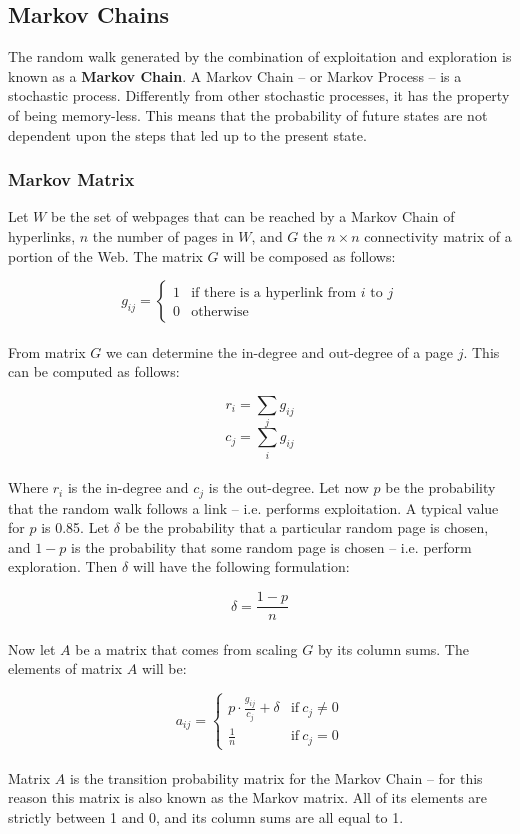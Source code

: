 \documentclass{article}
\begin{document}
\subsection{Markov Chains}
The random walk generated by the combination of exploitation and exploration is known as a \textbf{Markov Chain}. A Markov Chain -- or Markov Process -- is a stochastic process. Differently from other stochastic processes, it has the property of being memory-less. This means that the probability of future states are not dependent upon the steps that led up to the present state.

\subsubsection{Markov Matrix}
Let $W$ be the set of webpages that can be reached by a Markov Chain of hyperlinks, $n$ the number of pages in $W$, and $G$ the $n \times n$ connectivity matrix of a portion of the Web. The matrix $G$ will be composed as follows:

\[ g_{ij} = \begin{cases} 1 & \text{if there is a hyperlink from $i$ to $j$} \\ 0 & \text{otherwise} \end{cases} \] \\
From matrix $G$ we can determine the in-degree and out-degree of a page $j$. This can be computed as follows:

\[ r_i = \sum_j g_{ij} \]
\[ c_j = \sum_i g_{ij} \] \\
Where $r_i$ is the in-degree and $c_j$ is the out-degree. Let now $p$ be the probability that the random walk follows a link -- i.e. performs exploitation. A typical value for $p$ is 0.85. Let $\delta$ be the probability that a particular random page is chosen, and $1-p$ is the probability that some random page is chosen -- i.e. perform exploration. Then $\delta$ will have the following formulation:

\[ \delta = \frac{1-p}{n} \] \\
Now let $A$ be a matrix that comes from scaling $G$ by its column sums. The elements of matrix $A$ will be:

\[ a_{ij} = \begin{cases} p \cdot \displaystyle\frac{g_{ij}}{c_j} + \delta & \text{if}~c_j \neq 0 \\ \displaystyle\frac{1}{n} & \text{if}~ c_j = 0 \end{cases} \] \\
Matrix $A$ is the transition probability matrix for the Markov Chain -- for this reason this matrix is also known as the Markov matrix. All of its elements are strictly between 1 and 0, and its column sums are all equal to 1.
\end{document}
